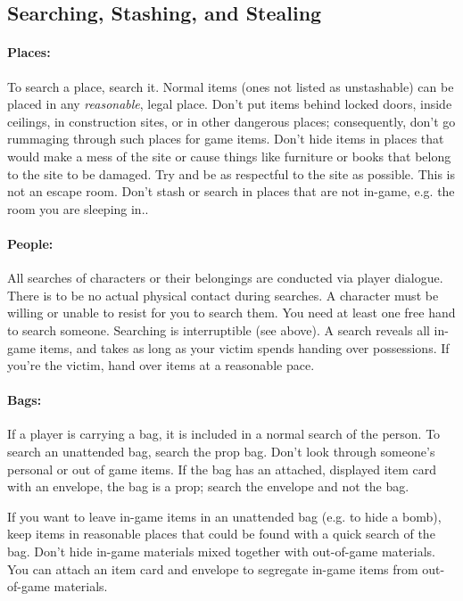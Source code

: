 \documentclass[sheet]{GL2020}
\begin{document}
\subsection{Searching, Stashing, and Stealing}

\paragraph{Places:} To search a place, search it.  Normal items (ones not listed as unstashable) can be placed in any \emph{reasonable}, legal place. Don't put items behind locked doors, inside ceilings, in construction sites, or in other dangerous places; consequently, don't go rummaging through such places for game items. Don’t hide items in places that would make a mess of the site or cause things like furniture or books that belong to the site to be damaged.  Try and be as respectful to the site as possible. This is not an escape room. Don't stash or search in places that are not in-game, e.g. the room you are sleeping in..

\paragraph{People:} All searches of characters or their belongings are conducted via player dialogue. There is to be no actual physical contact during searches. A character must be willing or unable to resist for you to search them.  You need at least one free hand to search someone. Searching is interruptible (see above). A search reveals all in-game items, and takes as long as your victim spends handing over possessions. If you're the victim, hand over items at a reasonable pace.

\paragraph{Bags:} If a player is carrying a bag, it is included in a normal search of the person. To search an unattended bag, search the prop bag. Don't look through someone's personal or out of game items. If the bag has an attached, displayed item card with an envelope, the bag is a prop; search the envelope and not the bag.

If you want to leave in-game items in an unattended bag (e.g. to hide a bomb), keep items in reasonable places that could be found with a quick search of the bag. Don't hide in-game materials mixed together with out-of-game materials. You can attach an item card and envelope to segregate in-game items from out-of-game materials.
\end{document}

